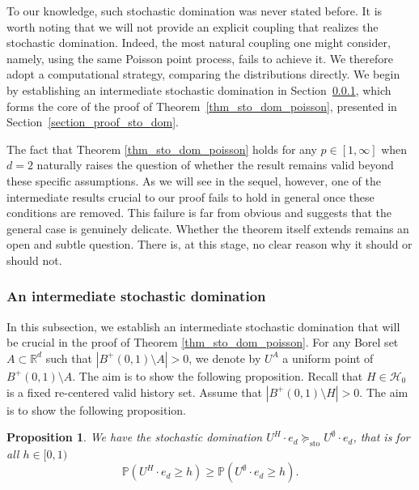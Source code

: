 \documentclass[a4paper, 11pt]{article}
\theoremstyle{plain}
\newtheorem{Proposition}[Theorem]{Proposition}
\theoremstyle{definition}
\newcommand{\R}{\mathbb{R}}
\renewcommand{\P}{\mathbb{P}}
\numberwithin{equation}{section}
\begin{document}
To our knowledge, such stochastic domination was never stated before. It is worth noting that we will not provide an explicit coupling that realizes the stochastic domination. Indeed, the most natural coupling one might consider, namely, using the same Poisson point process, fails to achieve it. We therefore adopt a computational strategy, comparing the distributions directly. We begin by establishing an intermediate stochastic domination in Section~\ref{section_uniform_sto_dom}, which forms the core of the proof of Theorem~\ref{thm_sto_dom_poisson}, presented in Section~\ref{section_proof_sto_dom}.

The fact that Theorem \ref{thm_sto_dom_poisson} holds for any $p\in[1, \infty]$ when $d=2$ naturally raises the question of whether the result remains valid beyond these specific assumptions. As we will see in the sequel, however, one of the intermediate results crucial to our proof fails to hold in general once these conditions are removed. This failure is far from obvious and suggests that the general case is genuinely delicate. Whether the theorem itself extends remains an open and subtle question. There is, at this stage, no clear reason why it should or should not.


\subsubsection{An intermediate stochastic domination}

\label{section_uniform_sto_dom}


In this subsection, we establish an intermediate stochastic domination that will be crucial in the proof of Theorem \ref{thm_sto_dom_poisson}. For any Borel set $A\subset\R^d$ such that $|B^+(0,1)\setminus A|>0$, we denote by $U^A$ a uniform point of $B^+(0,1)\setminus A$. The aim is to show the following proposition. Recall that $H\in\mathcal H_0$ is a fixed re-centered valid history set. Assume that $|B^+(0,1)\setminus H|>0$. The aim is to show the following proposition.


\begin{Proposition}
    \label{prop_sto_dom}
    We have the stochastic domination $U^H\cdot e_d\succeq_{\mathrm{sto}}U^\emptyset\cdot e_d$, that is for all $h\in[0, 1)$
    \begin{equation}
        \label{eq_dom}
        \P(U^H\cdot e_d\geq h)\geq\P(U^\emptyset\cdot e_d\geq h).
    \end{equation}
\end{Proposition}
\end{document}
